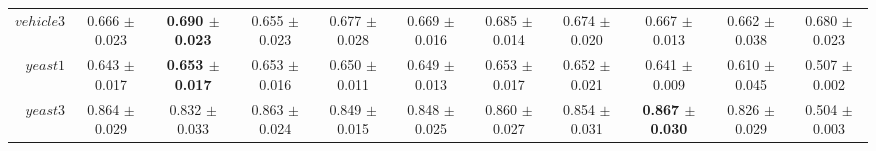 \begin{table}[!ht]
{\begin{tabular}{r c c c c c c c c c c}
$vehicle3$ & 0.666 $\pm$ 0.023 & \textbf{0.690 $\pm$ 0.023} & 0.655 $\pm$ 0.023 & 0.677 $\pm$ 0.028 & 0.669 $\pm$ 0.016 & 0.685 $\pm$ 0.014 & 0.674 $\pm$ 0.020 & 0.667 $\pm$ 0.013 & 0.662 $\pm$ 0.038 & 0.680 $\pm$ 0.023 \\
$yeast1$ & 0.643 $\pm$ 0.017 & \textbf{0.653 $\pm$ 0.017} & 0.653 $\pm$ 0.016 & 0.650 $\pm$ 0.011 & 0.649 $\pm$ 0.013 & 0.653 $\pm$ 0.017 & 0.652 $\pm$ 0.021 & 0.641 $\pm$ 0.009 & 0.610 $\pm$ 0.045 & 0.507 $\pm$ 0.002 \\
$yeast3$ & 0.864 $\pm$ 0.029 & 0.832 $\pm$ 0.033 & 0.863 $\pm$ 0.024 & 0.849 $\pm$ 0.015 & 0.848 $\pm$ 0.025 & 0.860 $\pm$ 0.027 & 0.854 $\pm$ 0.031 & \textbf{0.867 $\pm$ 0.030} & 0.826 $\pm$ 0.029 & 0.504 $\pm$ 0.003 \\
\end{tabular}}
\end{table}
